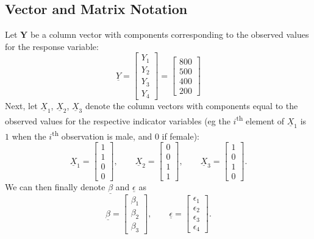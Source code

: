 \documentclass{article}
\begin{document}
\subsection{Vector and Matrix Notation}\label{sec:vec_not}
Let $\mathbf{Y}$ be a column vector with components corresponding to the observed values for the response variable:
\begin{equation}
    \underline{Y} = \begin{bmatrix} Y_1 \\ Y_2 \\ Y_3 \\ Y_4 \end{bmatrix} = \begin{bmatrix} 800 \\ 500 \\ 400 \\ 200 \end{bmatrix}
\end{equation}
Next, let $\underline{X}_1$, $\underline{X}_2$, $\underline{X}_3$ denote the column vectors with components equal to the observed values for the respective indicator variables (eg the $i$\textsuperscript{th} element of $\underline{X}_1$ is $1$ when the $i$\textsuperscript{th} observation is male, and $0$ if female):
\begin{equation}
    \underline{X}_1 = \begin{bmatrix} 1 \\ 1 \\ 0 \\ 0 \end{bmatrix},\qquad \underline{X}_2 = \begin{bmatrix} 0 \\ 0 \\ 1 \\ 1 \end{bmatrix},\qquad \underline{X}_3 = \begin{bmatrix} 1 \\ 0 \\ 1 \\ 0 \end{bmatrix}.
\end{equation}
We can then finally denote $\underline{\beta}$ and $\underline{\epsilon}$ as
\begin{equation}
    \underline{\beta}=\begin{bmatrix} \beta_1 \\ \beta_2 \\ \beta_3 \end{bmatrix},\qquad \underline{\epsilon}=\begin{bmatrix} \epsilon_1 \\ \epsilon_2 \\ \epsilon_3 \\ \epsilon_4 \end{bmatrix}.
\end{equation}
\end{document}
